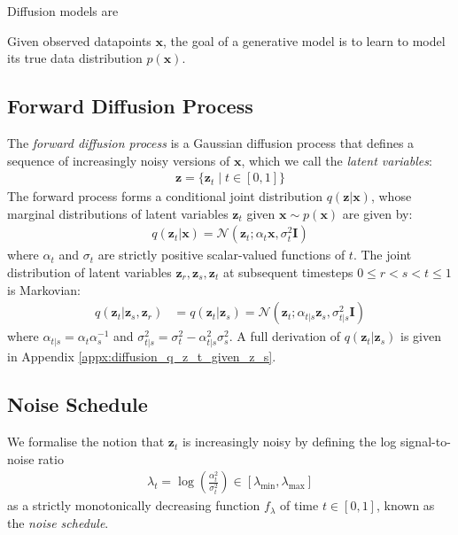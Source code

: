 \documentclass[ oneside,%
                    author={George Herbert},
                    degree={MSci},
                     title={Video Diffusion Models for Climate Simulations},
                  subtitle={}]{dissertation}
\begin{document}
Diffusion models are 

Given observed datapoints $\mathbf{x}$, the goal of a generative model is to learn to model its true data distribution $p(\mathbf{x})$.

\subsection{Forward Diffusion Process}
\label{sec:background_diffusion_forward}

The \textit{forward diffusion process} is a Gaussian diffusion process that defines a sequence of increasingly noisy versions of $\mathbf{x}$, which we call the \textit{latent variables}:
\begin{align}
      \mathbf{z}=\{\mathbf{z}_t\mid t\in[0,1]\}
\end{align}
The forward process forms a conditional joint distribution $q(\mathbf{z}|\mathbf{x})$, whose marginal distributions of latent variables $\mathbf{z}_t$ given $\mathbf{x}\sim p(\mathbf{x})$ are given by:
\begin{align}
      q(\mathbf{z}_t|\mathbf{x})=\mathcal{N}\left(\mathbf{z}_t;\alpha_t\mathbf{x},\sigma_t^2\mathbf{I}\right)
      \label{eq:q_z_t_given_x}
\end{align}
where $\alpha_t$ and $\sigma_t$ are strictly positive scalar-valued functions of $t$. The joint distribution of latent variables $\mathbf{z}_r,\mathbf{z}_s,\mathbf{z}_t$ at subsequent timesteps $0\le r < s < t \le 1$ is Markovian:
\begin{align}
      q(\mathbf{z}_t|\mathbf{z}_s,\mathbf{z}_r)&=q(\mathbf{z}_t|\mathbf{z}_s)=\mathcal{N}\left(\mathbf{z}_t; \alpha_{t|s}\mathbf{z}_s, \sigma_{t|s}^2\mathbf{I}\right)
\end{align}
where $\alpha_{t|s}=\alpha_t\alpha_s^{-1}$ and $\sigma_{t|s}^2=\sigma_t^2-\alpha_{t|s}^2\sigma_s^2$. A full derivation of $q(\mathbf{z}_t|\mathbf{z}_s)$ is given in Appendix \ref{appx:diffusion_q_z_t_given_z_s}.

\subsection{Noise Schedule}
\label{sec:background_diffusion_noise_schedule}

We formalise the notion that $\mathbf{z}_t$ is increasingly noisy by defining the log signal-to-noise ratio
\begin{align}
      \lambda_t = \log\left( \frac{\alpha_t^2}{\sigma_t^2}\right)\in[\lambda_{\min}, \lambda_{\max}]
\end{align}
as a strictly monotonically decreasing function $f_{\lambda}$ of time $t\in[0, 1]$, known as the \textit{noise schedule}.
\end{document}
